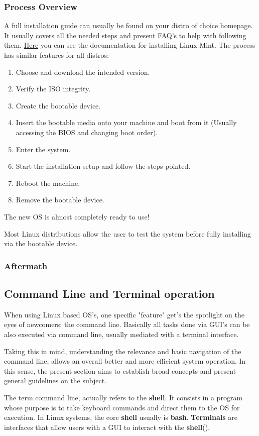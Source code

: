 \documentclass[a4paper,11pt]{article}
\begin{document}
\subsubsection{Process Overview}
A full installation guide can usually be found on your distro of choice
homepage. It usually covers all the needed steps and present FAQ's to help with
following them.
\href{https://linuxmint-installation-guide.readthedocs.io/en/latest/}{Here} 
you can see the documentation for installing Linux Mint.
The process has similar features for all distros:
\begin{enumerate}
    \item Choose and download the intended version.
    \item Verify the ISO integrity.
    \item Create the bootable device.
    \item Insert the bootable media onto your machine and boot from it (Usually
        accessing the BIOS and changing boot order).
    \item Enter the system.
    \item Start the installation setup and follow the steps pointed.
    \item Reboot the machine.
    \item Remove the bootable device.
\end{enumerate}
The new OS is almost completely ready to use!
\begin{tipbox}
Most Linux distributions allow the user to test the system before fully
installing via the bootable device.
\end{tipbox}
\subsubsection{Aftermath}


\subsection{Command Line and Terminal operation}
When using Linux based OS's, one specific "feature" get's the spotlight on the
eyes of newcomers: the command line. Basically all tasks done via GUI's can be
also executed via command line, usually mediated with a terminal interface.\par
Taking this in mind, understanding the relevance and basic navigation of the
command line, allows an overall better and more efficient system operation. In
this sense, the present section aims to establish broad concepts and present
general guidelines on the subject.
\begin{definitionbox}
    The term command line, actually refers to the \textbf{shell}. It consists in
    a program whose purpose is to take keyboard commands and direct them to the
    OS for execution. In Linux systems, the core \textbf{shell} usually is
    \textbf{bash}. \textbf{Terminals} are interfaces that allow users with a GUI to
    interact with the \textbf{shell}(\cite{shottsLinuxCommandLine2024}).
\end{definitionbox}
\end{document}
